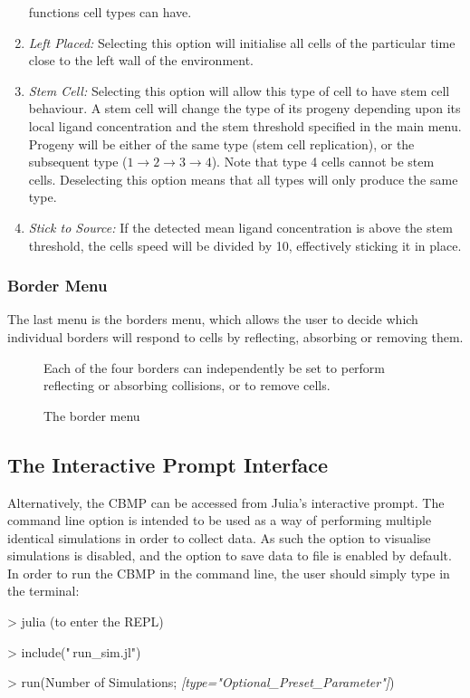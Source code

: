 \documentclass[12pt]{article}
\begin{document}
\begin{enumerate}
functions cell types can have.
\item {\itshape Left Placed: }Selecting this option will initialise all 
cells of the particular time close to the left wall of the environment.
\item {\itshape Stem Cell: }Selecting this option will allow this type 
of cell to have stem cell behaviour. A stem cell will change the type of 
its progeny depending upon its local ligand concentration and the stem 
threshold specified in the main menu. Progeny will be either of the same 
type (stem cell replication), or the subsequent type  
(\(1 \rightarrow 2 \rightarrow 3 \rightarrow 4\)). Note that type 4 cells cannot be stem cells. Deselecting this option 
means that all types will only produce the same type.
\item {\itshape Stick to Source: }If the detected mean ligand 
concentration is above the stem threshold, the cells speed will be 
divided by 10, effectively sticking it in place. 
\end{enumerate}

\subsubsection{Border Menu}

The last menu is the borders menu, which allows the user to decide which 
individual borders will respond to cells by reflecting, absorbing or 
removing them.

\begin{figure}[H]
\centering
\caption[]{The border menu}Each of the four 
borders can independently be set to perform reflecting or absorbing 
collisions, or to remove cells.
\end{figure}

\subsection{The Interactive Prompt Interface}
Alternatively, the CBMP can be accessed from Julia's interactive prompt. 
The command line option is intended to be used as a way of performing 
multiple identical simulations in order to collect data. As such the 
option to visualise simulations is disabled, and the option to save data 
to file is enabled by default. In order to run the CBMP in the command 
line, the user should simply type in the terminal: \\

{\fontsize{11pt}{11pt} \ttfamily 
> julia (to enter the REPL)

> include("\,run\_sim.jl")

> run(Number of Simulations; {\itshape[type="Optional\_Preset\_Parameter"]})}\\
\end{document}
